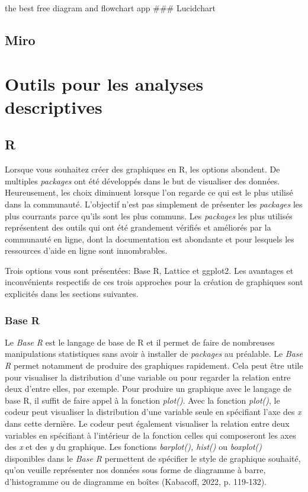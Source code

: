 \documentclass[
  letterpaper,
  DIV=11,
  numbers=noendperiod]{scrreprt}
\begin{document}
the best free diagram and flowchart app \#\#\# Lucidchart

\subsection{Miro}\label{miro}

\section{Outils pour les analyses
descriptives}\label{outils-pour-les-analyses-descriptives}

\subsection{R}\label{r}

Lorsque vous souhaitez créer des graphiques en R, les options abondent.
De multiples \emph{packages} ont été développés dans le but de
visualiser des données. Heureusement, les choix diminuent lorsque l'on
regarde ce qui est le plus utilisé dans la communauté. L'objectif n'est
pas simplement de présenter les \emph{packages} les plus courrants parce
qu'ils sont les plus communs. Les \emph{packages} les plus utilisés
représentent des outils qui ont été grandement vérifiés et améliorés par
la communauté en ligne, dont la documentation est abondante et pour
lesquels les ressources d'aide en ligne sont innombrables.

Trois options vous sont présentées: Base R, Lattice et ggplot2. Les
avantages et inconvénients respectifs de ces trois approches pour la
création de graphiques sont explicités dans les sections suivantes.

\subsubsection{Base R}\label{base-r}

Le \emph{Base R} est le langage de base de R et il permet de faire de
nombreuses manipulations statistiques sans avoir à installer de
\emph{packages} au préalable. Le \emph{Base R} permet notamment de
produire des graphiques rapidement. Cela peut être utile pour visualiser
la distribution d'une variable ou pour regarder la relation entre deux
d'entre elles, par exemple. Pour produire un graphique avec le langage
de base R, il suffit de faire appel à la fonction \emph{plot()}. Avec la
fonction \emph{plot()}, le codeur peut visualiser la distribution d'une
variable seule en spécifiant l'axe des \emph{x} dans cette dernière. Le
codeur peut également visualiser la relation entre deux variables en
spécifiant à l'intérieur de la fonction celles qui composeront les axes
des \emph{x} et des \emph{y} du graphique. Les fonctions
\emph{barplot(), hist()} ou \emph{boxplot()} disponibles dans le
\emph{Base R} permettent de spécifier le style de graphique souhaité,
qu'on veuille représenter nos données sous forme de diagramme à barre,
d'histogramme ou de diagramme en boîtes (Kabacoff, 2022, p. 119‑132).
\end{document}
